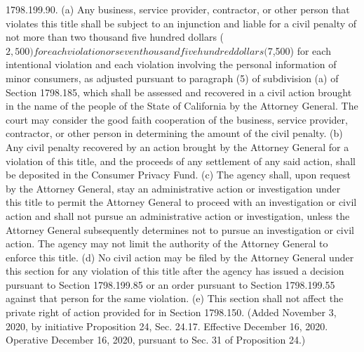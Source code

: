 1798.199.90.  (a) Any business, service provider, contractor, or other person that violates this title shall be subject to an injunction and liable for a civil penalty of not more than two thousand five hundred dollars ($2,500) for each violation or seven thousand five hundred dollars ($7,500) for each intentional violation and each violation involving the personal information of minor consumers, as adjusted pursuant to paragraph (5) of subdivision (a) of Section 1798.185, which shall be assessed and recovered in a civil action brought in the name of the people of the State of California by the Attorney General. The court may consider the good faith cooperation of the business, service provider, contractor, or other person in determining the amount of the civil penalty.
(b) Any civil penalty recovered by an action brought by the Attorney General for a violation of this title, and the proceeds of any settlement of any said action, shall be deposited in the Consumer Privacy Fund.
(c) The agency shall, upon request by the Attorney General, stay an administrative action or investigation under this title to permit the Attorney General to proceed with an investigation or civil action and shall not pursue an administrative action or investigation, unless the Attorney General subsequently determines not to pursue an investigation or civil action. The agency may not limit the authority of the Attorney General to enforce this title.
(d) No civil action may be filed by the Attorney General under this section for any violation of this title after the agency has issued a decision pursuant to Section 1798.199.85 or an order pursuant to Section 1798.199.55 against that person for the same violation.
(e) This section shall not affect the private right of action provided for in Section 1798.150.
(Added November 3, 2020, by initiative Proposition 24, Sec. 24.17. Effective December 16, 2020. Operative December 16, 2020, pursuant to Sec. 31 of Proposition 24.)

